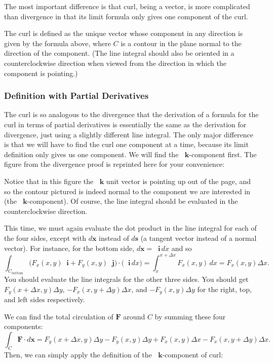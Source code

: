 \documentclass{myarticle}
\renewcommand{\vec}[1]{\mathbf{#1}}
\newcommand{\unitvector}[1]{
  \mathop{}\!\vec{#1}
}
\newcommand{\ih}{\unitvector{i}}
\newcommand{\jh}{\unitvector{j}}
\newcommand{\kh}{\unitvector{k}}
\theoremstyle{nospace}
\newtheorem{old series theorem}{Theorem}
\newenvironment{series theorem}{\begin{mdframed}\begin{old series theorem}}{\end{old series theorem}\end{mdframed}}
\begin{document}
The most important difference is that curl, being a vector, is more complicated than divergence in that its limit formula only gives one component of the curl.

The curl is defined as the unique vector whose component in any direction is given by the formula above, where $C$ is a contour in the plane normal to the direction of the component. (The line integral should also be oriented in a counterclockwise direction when viewed from the direction in which the component is pointing.)

\subsubsection{Definition with Partial Derivatives} \label{sec:curl definition with partial derivatives}

The curl is so analogous to the divergence that the derivation of a formula for the curl in terms of partial derivatives is essentially the same as the derivation for divergence, just using a slightly different line integral. The only major difference is that we will have to find the curl one component at a time, because its limit definition only gives us one component. We will find the $\kh$-component first. The figure from the divergence proof is reprinted here for your convenience:

\begin{figure}[htb!] \centering
\usebox{\divergencerectangle}
\end{figure}

Notice that in this figure the $\kh$ unit vector is pointing up out of the page, and so the contour pictured is indeed normal to the component we are interested in (the $\kh$-component). Of course, the line integral should be evaluated in the counterclockwise direction.

This time, we must again evaluate the dot product in the line integral for each of the four sides, except with $d\vec{x}$ instead of $d\vec{s}$ (a tangent vector instead of a normal vector). For instance, for the bottom side, $d\vec{x} = \ih \,dx$ and so \[ \int_{C_{\text{bottom}}} \big(F_x(x, y) \ih + F_y(x, y) \jh\big) \cdot \big(\ih \,dx\big) = \int_x^{x + \Delta x} F_x(x, y) \,dx = F_x(x, y)\Delta x. \] You should evaluate the line integrals for the other three sides. You should get $F_y(x + \Delta x, y)\Delta y$, $-F_x(x, y + \Delta y)\Delta x$, and $-F_y(x, y)\Delta y$ for the right, top, and left sides respectively.

We can find the total circulation of $\vec{F}$ around $C$ by summing these four components: \[ \int_C \vec{F} \cdot d\vec{x} = F_y(x + \Delta x, y)\Delta y - F_y(x, y)\Delta y + F_x(x, y)\Delta x - F_x(x, y + \Delta y)\Delta x. \] Then, we can simply apply the definition of the $\kh$-component of curl:
\end{document}

